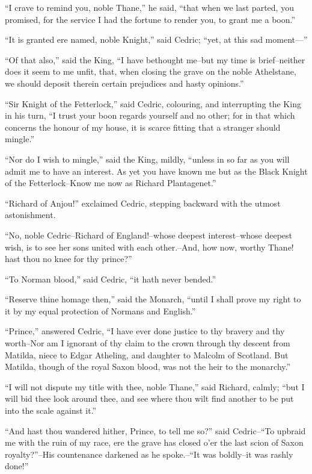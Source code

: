 ``I crave to remind you, noble Thane,'' he said, ``that when we last
parted, you promised, for the service I had the fortune to render you,
to grant me a boon.''

``It is granted ere named, noble Knight,'' said Cedric; ``yet, at this
sad moment---''

``Of that also,'' said the King, ``I have bethought me--but my time is
brief--neither does it seem to me unfit, that, when closing the grave on
the noble Athelstane, we should deposit therein certain prejudices and
hasty opinions.''

``Sir Knight of the Fetterlock,'' said Cedric, colouring, and
interrupting the King in his turn, ``I trust your boon regards yourself
and no other; for in that which concerns the honour of my house, it is
scarce fitting that a stranger should mingle.''

``Nor do I wish to mingle,'' said the King, mildly, ``unless in so far
as you will admit me to have an interest. As yet you have known me but
as the Black Knight of the Fetterlock--Know me now as Richard
Plantagenet.''

``Richard of Anjou!'' exclaimed Cedric, stepping backward with the
utmost astonishment.

``No, noble Cedric--Richard of England!--whose deepest interest--whose
deepest wish, is to see her sons united with each other.--And, how now,
worthy Thane! hast thou no knee for thy prince?''

``To Norman blood,'' said Cedric, ``it hath never bended.''

``Reserve thine homage then,'' said the Monarch, ``until I shall prove
my right to it by my equal protection of Normans and English.''

``Prince,'' answered Cedric, ``I have ever done justice to thy bravery
and thy worth--Nor am I ignorant of thy claim to the crown through thy
descent from Matilda, niece to Edgar Atheling, and daughter to Malcolm
of Scotland. But Matilda, though of the royal Saxon blood, was not the
heir to the monarchy.''

``I will not dispute my title with thee, noble Thane,'' said Richard,
calmly; ``but I will bid thee look around thee, and see where thou wilt
find another to be put into the scale against it.''

``And hast thou wandered hither, Prince, to tell me so?'' said
Cedric--``To upbraid me with the ruin of my race, ere the grave has
closed o'er the last scion of Saxon royalty?''--His countenance darkened
as he spoke.--``It was boldly--it was rashly done!''

